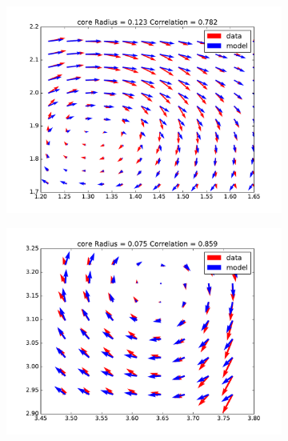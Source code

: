\documentclass[12pt, a4paper, openany]{memoir}
\begin{document}
\begin{figure}[h!]
	\centering
	\begin{subfigure}[b]{0.45\textwidth}
		\centering
		\includegraphics[trim=40 20 40 20 ,clip, width=\textwidth]{figure/dns_fit1.pdf}
		\caption{}
	\end{subfigure}
	\begin{subfigure}[b]{0.45\textwidth}
		\centering
		\includegraphics[trim=40 20 40 20 ,clip, width=\textwidth]{figure/dns_fit2.pdf}
		\caption{}
	\end{subfigure}
	\begin{subfigure}[b]{0.45\textwidth}
		\centering

\end{subfigure}
\end{figure}
\end{document}
